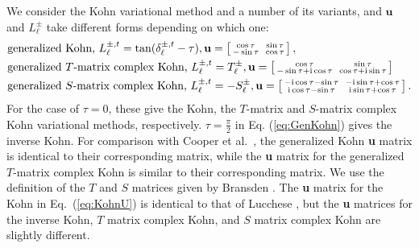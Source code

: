 \documentclass[preprint,showpacs,showkeys,preprintnumbers,amsmath,amssymb,longbibliography,pra,aps]{revtex4-1}
\newcommand{\ii}{{\rm{i}}}
\begin{document}
We consider the Kohn variational method and a number of its variants,
and $\textbf{u}$ and $L^{\pm}_\ell$ take
different forms depending on which one:
\begin{subequations}
\label{eq:KohnU}
\begin{align}
&\text{generalized Kohn, } L^{\pm,t}_\ell = \tan(\delta^{\pm,t}_\ell-\tau),
 \textbf{u} = \left[ \begin{smallmatrix}
\cos \tau & \ \sin \tau \\  -\sin \tau & \  \cos \tau
\end{smallmatrix} \right], \label{eq:GenKohn}\\
&\text{generalized $T$-matrix complex Kohn, } L^{\pm,t}_\ell = T_\ell^{\pm},
 \textbf{u} = \left[ \begin{smallmatrix}
\cos\tau & \ \sin\tau \\ -\sin\tau + \ii \cos\tau & \ \cos\tau + \ii \sin\tau
\end{smallmatrix} \right] \label{eq:GenTKohn} \\
&\text{generalized $S$-matrix complex Kohn, } L^{\pm,t}_\ell = -S_\ell^{\pm},
 \textbf{u} = \left[ \begin{smallmatrix}
-\ii \cos\tau - \sin\tau & \ -\ii\sin\tau + \cos\tau \\ 
 \ii\cos\tau - \sin\tau & \ \ii\sin\tau + \cos\tau
\end{smallmatrix} \right]. \label{eq:GenSKohn}
\end{align}
\end{subequations}
For the case of $\tau = 0$, these give the Kohn, the $T$-matrix and
$S$-matrix complex Kohn variational methods, respectively.
$\tau = \frac{\pi}{2}$ in Eq. (\ref{eq:GenKohn})
gives the inverse Kohn. 
For comparison with Cooper et al.\ \cite{Cooper2010}, the generalized
Kohn \textbf{u} matrix is identical to their corresponding matrix,
while the \textbf{u} matrix for the generalized $T$-matrix complex Kohn
is similar to their corresponding matrix.
We use the definition of the $T$ and $S$ matrices
given by Bransden \cite{Bransden1970}.
The \textbf{u} matrix for the Kohn in Eq.~(\ref{eq:KohnU}) is identical
to that of Lucchese \cite{Lucchese1989}, but the \textbf{u} matrices for
the inverse Kohn, $T$ matrix complex Kohn, and $S$ matrix
complex Kohn are slightly different.
\end{document}
